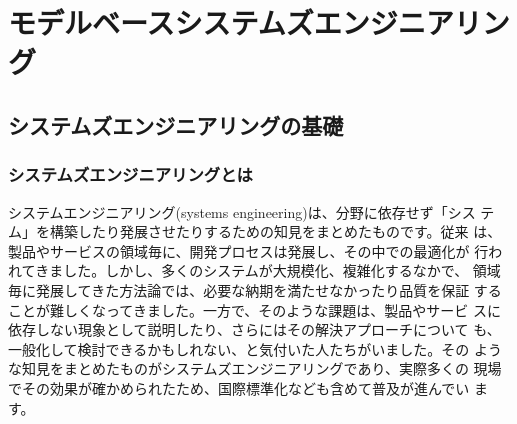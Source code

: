 \chapter{モデルベースシステムズエンジニアリング}
\label{chap4}

\section{システムズエンジニアリングの基礎}

\subsection{システムズエンジニアリングとは}
システムエンジニアリング(systems engineering)は、分野に依存せず「シス
  テム」を構築したり発展させたりするための知見をまとめたものです。従来
は、製品やサービスの領域毎に、開発プロセスは発展し、その中での最適化が
行われてきました。しかし、多くのシステムが大規模化、複雑化するなかで、
領域毎に発展してきた方法論では、必要な納期を満たせなかったり品質を保証
することが難しくなってきました。一方で、そのような課題は、製品やサービ
スに依存しない現象として説明したり、さらにはその解決アプローチについて
も、一般化して検討できるかもしれない、と気付いた人たちがいました。その
ような知見をまとめたものがシステムズエンジニアリングであり、実際多くの
現場でその効果が確かめられたため、国際標準化なども含めて普及が進んでい
ます。

